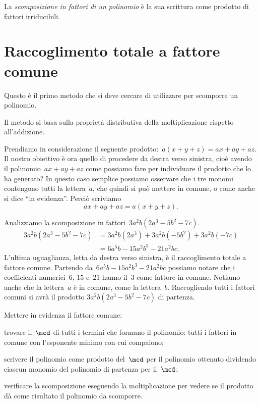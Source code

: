 \begin{definizione}
La \emph{scomposizione in fattori di un polinomio} è la sua scrittura come prodotto di fattori irriducibili.
\end{definizione}
\ovalbox{\risolvi \ref{ese:15.1}}

\section{Raccoglimento totale a fattore comune}
Questo è il primo metodo che si deve cercare di utilizzare per scomporre un polinomio.

Il metodo si basa sulla proprietà distributiva della moltiplicazione rispetto all'addizione.

Prendiamo in considerazione il seguente prodotto:~$a(x+y+z)=ax+ay+az$.
Il nostro obiettivo è ora quello di procedere
da destra verso sinistra, cioè avendo il polinomio~$ax+ay+az$ come possiamo fare per individuare il prodotto che lo ha generato?
In questo caso semplice possiamo osservare che i tre monomi contengono tutti la lettera~$a$, che quindi si può mettere in comune,
o come anche si dice ``in evidenza''.
Perciò scriviamo \[ax+ay+az=a(x+y+z).\]

\begin{exrig}
 \begin{esempio}
Analizziamo la scomposizione in fattori~$3a^{2}b\left(2a^{3}-5b^{2}-7c\right)$.
 \begin{equation*}
   \begin{split}
    3a^{2}b\left(2a^{3}-5b^{2}-7c\right) &=3a^{2}b(2a^{3})+3a^{2}b(-5b^{2})+3a^{2}b(-7c)\\
    &=6a^{5}b-15a^{2}b^{3}-21a^{2}bc.
   \end{split}
 \end{equation*}
L'ultima uguaglianza, letta da destra verso sinistra, è il raccoglimento totale a fattore comune.
Partendo da~$6a^{5}b-15a^{2}b^{3}-21a^{2}bc$ possiamo notare che i coefficienti numerici~$6$, $15$ e~$21$ hanno il~$3$ come fattore in comune.
Notiamo anche che la lettera~$a$ è in comune, come la lettera~$b$. Raccogliendo tutti i fattori comuni si avrà il prodotto
$3a^{2}b\left(2a^{3}-5b^{2}-7c\right)$ di partenza.
 \end{esempio}
\end{exrig}

\begin{procedura}
Mettere in evidenza il fattore comune:
\begin{enumeratea}
\item trovare il~$\mcd$ di tutti i termini che formano il polinomio: tutti i fattori in comune con l'esponente minimo con cui compaiono;
\item scrivere il polinomio come prodotto del~$\mcd$ per il polinomio ottenuto dividendo ciascun monomio del polinomio di partenza per il~$\mcd$;
\item verificare la scomposizione eseguendo la moltiplicazione per vedere se il prodotto dà come risultato il polinomio da scomporre.
\end{enumeratea}
\end{procedura}

